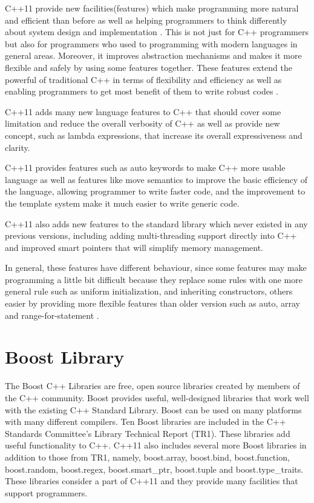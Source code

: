 \documentclass[11pt]{report}
\begin{document}
C++11 provide new facilities(features) which make programming more \linebreak natural and efficient than before as well as helping programmers to think \linebreak differently about system design and implementation \cite{Stroustrup:2012:Cpp11}. This is not just for C++ programmers but also for programmers who used to programming with modern languages in general areas. Moreover, it improves abstraction \linebreak mechanisms and makes it more flexible and safely by using some features \linebreak together. These features extend the powerful of traditional C++ in terms of flexibility and efficiency as well as enabling programmers to get most benefit of them to write robust codes \cite{ISO:2011:Cpplanguage}.

C++11 adds many new language features to C++ that should cover some limitation and reduce the overall verbosity of C++ as well as provide new concept, such as lambda expressions, that increase its overall expressiveness and clarity.

C++11 provides features such as auto keywords to make C++ more usable language as well as features like move semantics to improve the basic efficiency of the language, allowing programmer to write faster code, and the improvement to the template system make it much easier to write generic code\cite{Stroustrup:2005:Cpp}.

C++11 also adds new features to the standard library which never existed in any previous versions, including adding multi-threading support directly into C++ and improved smart pointers that will simplify memory management. 

In general, these features have different behaviour, since some features may make programming a little bit difficult because they replace some rules with one more general rule such as uniform initialization,  and inheriting constructors, others easier by providing more flexible features than older version such as auto, array and range-for-statement \cite{Stroustrup:2012:Cpp11}.

	

\section{Boost Library}
\label{section: Boost Library}
The Boost C++ Libraries are free, open source libraries created by members of the C++ community. Boost provides useful, well-designed libraries that work well with the existing C++ Standard Library. Boost can be used on many platforms with many different compilers. Ten Boost libraries are included in the C++ Standards Committee's Library Technical Report (TR1). These \linebreak libraries add useful functionality to C++.  C++11 also includes several more Boost libraries in addition to those from TR1, namely, boost.array, boost.bind, boost.function, boost.random, boost.regex, boost.smart\_ptr, boost.tuple and boost.type\_traits. These libraries consider a part of C++11 and they provide many facilities that support programmers\cite{Deitel:2012:CPP}.
\end{document}

